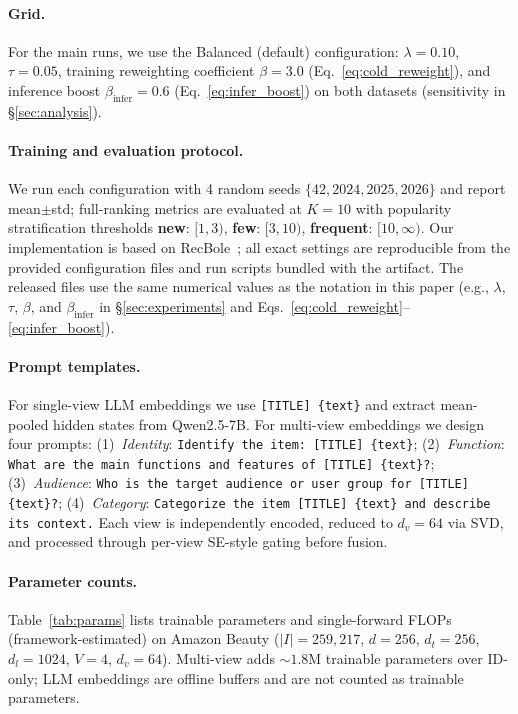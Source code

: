 \documentclass[sigconf,natbib=true,anonymous]{acmart}
\newcommand{\llm}{\textsc{LLM}\xspace}
\begin{document}
\paragraph{Grid.}
For the main runs, we use the Balanced (default) configuration:
$\lambda=0.10$, $\tau=0.05$, training reweighting coefficient
$\beta=3.0$ (Eq.~\eqref{eq:cold_reweight}), and inference boost
$\beta_{\text{infer}}=0.6$ (Eq.~\eqref{eq:infer_boost}) on both datasets
(sensitivity in \S\ref{sec:analysis}).
\paragraph{Training and evaluation protocol.}
We run each configuration with 4 random seeds
$\{42, 2024, 2025, 2026\}$ and report mean$\pm$std;
full-ranking metrics are evaluated at $K{=}10$
with popularity stratification thresholds
\textbf{new}: $[1,3)$, \textbf{few}: $[3,10)$,
\textbf{frequent}: $[10,\infty)$. Our implementation is based on
RecBole~\cite{zhao2021recbole}; all exact settings are
reproducible from the provided configuration files and run scripts
bundled with the artifact.
The released files use the same numerical values as the notation in this paper
(e.g., $\lambda$, $\tau$, $\beta$, and $\beta_{\text{infer}}$ in
\S\ref{sec:experiments} and Eqs.~\eqref{eq:cold_reweight}--\eqref{eq:infer_boost}).
\paragraph{Prompt templates.}
For single-view \llm embeddings we use \texttt{[TITLE] \{text\}} and
extract mean-pooled hidden states from Qwen2.5-7B.
For multi-view embeddings we design four prompts:
(1)~\emph{Identity}: \texttt{Identify the item: [TITLE] \{text\}};
(2)~\emph{Function}: \texttt{What are the main functions and features of [TITLE] \{text\}?};
(3)~\emph{Audience}: \texttt{Who is the target audience or user group for [TITLE] \{text\}?};
(4)~\emph{Category}: \texttt{Categorize the item [TITLE] \{text\} and describe its context.}
Each view is independently encoded, reduced to $d_v{=}64$ via SVD,
and processed through per-view SE-style gating before fusion.

\paragraph{Parameter counts.}
Table~\ref{tab:params} lists trainable parameters and single-forward
FLOPs (framework-estimated) on Amazon Beauty ($|I|{=}259{,}217$,
$d{=}256$, $d_t{=}256$, $d_l{=}1024$, $V{=}4$, $d_v{=}64$).
Multi-view adds ${\sim}1.8$M trainable parameters over ID-only; \llm
embeddings are offline buffers and are not counted as trainable
parameters.
\end{document}
